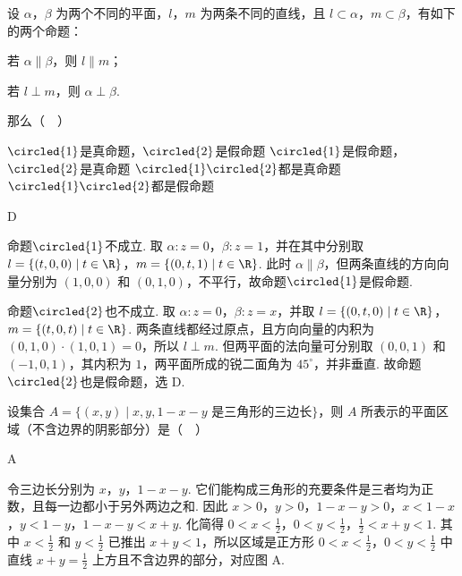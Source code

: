 \begin{problem}
设 \(\alpha\)，\(\beta\) 为两个不同的平面，\(l\)，\(m\) 为两条不同的直线，且 \(l \subset \alpha\)，\(m \subset \beta\)，有如下的两个命题：
\begin{circlelist}
\item 若 \(\alpha \parallel \beta\)，则 \(l \parallel m\)；
\item 若 \(l \perp m\)，则 \(\alpha \perp \beta\).
\end{circlelist}
那么（\(\quad\)）

\choices
    {\(\circled{1}\)是真命题，\(\circled{2}\)是假命题}
    {\(\circled{1}\)是假命题，\(\circled{2}\)是真命题}
    {\(\circled{1}\circled{2}\)都是真命题}
    {\(\circled{1}\circled{2}\)都是假命题}

\begin{answer}
D
\end{answer}

\begin{solution}
命题\(\circled{1}\)不成立. 取 \(\alpha:z=0\)，\(\beta:z=1\)，并在其中分别取
\(l=\{(t,0,0)\mid t\in\R\}\)，\(m=\{(0,t,1)\mid t\in\R\}\).
此时 \(\alpha\parallel\beta\)，但两条直线的方向向量分别为 \((1,0,0)\) 和 \((0,1,0)\)，不平行，故命题\(\circled{1}\)是假命题.

命题\(\circled{2}\)也不成立. 取 \(\alpha:z=0\)，\(\beta:z=x\)，并取
\(l=\{(0,t,0)\mid t\in\R\}\)，\(m=\{(t,0,t)\mid t\in\R\}\).
两条直线都经过原点，且方向向量的内积为
\((0,1,0)\cdot(1,0,1)=0\)，所以 \(l\perp m\). 但两平面的法向量可分别取 \((0,0,1)\) 和 \((-1,0,1)\)，其内积为 \(1\)，两平面所成的锐二面角为 \(45^{\circ}\)，并非垂直. 故命题\(\circled{2}\)也是假命题，选 D.
\end{solution}
\end{problem}

\begin{problem}
设集合 \(A=\{(x,y)\mid x,y,1-x-y\text{ 是三角形的三边长}\}\)，则 \(A\) 所表示的平面区域（不含边界的阴影部分）是（\(\quad\)）

    {}
    {}
    {}

\begin{answer}
A
\end{answer}

\begin{solution}
令三边长分别为 \(x\)，\(y\)，\(1-x-y\). 它们能构成三角形的充要条件是三者均为正数，且每一边都小于另外两边之和. 因此
\(x>0\)，\(y>0\)，\(1-x-y>0\)，\(x<1-x\)，\(y<1-y\)，\(1-x-y<x+y\).
化简得
\(0<x<\frac{1}{2}\)，\(0<y<\frac{1}{2}\)，\(\frac{1}{2}<x+y<1\).
其中 \(x<\frac{1}{2}\) 和 \(y<\frac{1}{2}\) 已推出 \(x+y<1\)，所以区域是正方形
\(0<x<\frac{1}{2}\)，\(0<y<\frac{1}{2}\) 中直线 \(x+y=\frac{1}{2}\) 上方且不含边界的部分，对应图 A.
\end{solution}
\end{problem}

